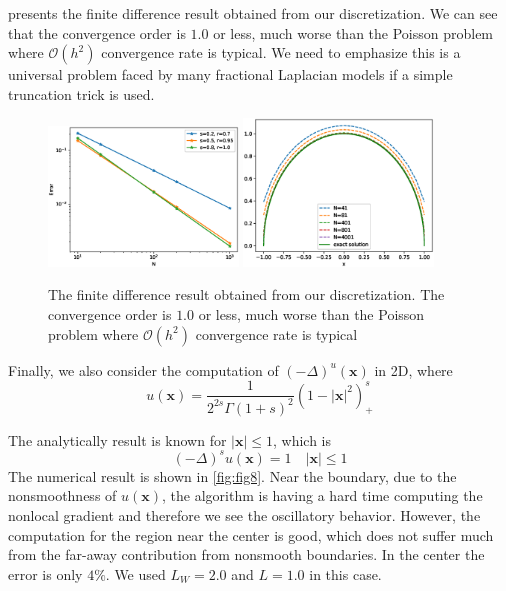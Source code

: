 \documentclass[3p,,preprint,12pt]{elsarticle}
\newcommand{\bx}[0]{\mathbf{x}}
\theoremstyle{definition}
\begin{document}
 presents the finite difference result obtained from our discretization. We can see that the convergence order is $1.0$ or less, much worse than the Poisson problem where $\mathcal{O}(h^2)$ convergence rate is typical. We need to emphasize this is a universal problem faced by many fractional Laplacian models if a simple truncation trick is used. 

\begin{figure}[H] %
\centering
\includegraphics[width=0.45\textwidth,keepaspectratio]{figures/fig6}
\includegraphics[width=0.45\textwidth,keepaspectratio]{figures/fig7}
\caption{The finite difference result obtained from our discretization. The convergence order is $1.0$ or less, much worse than the Poisson problem where $\mathcal{O}(h^2)$ convergence rate is typical}
\label{fig:fig6}
\end{figure}

Finally, we also consider the computation of $(-\Delta)^ u(\bx)$ in 2D, where~\cite{huang2016finite}
\begin{equation}
	u(\bx) = \frac{1}{2^{2s}\Gamma(1+s)^2} (1-|\bx|^2)^s_+
\end{equation}

The analytically result is known for $|\bx|\leq 1$, which is
\begin{equation}\label{equ:u1}
	(-\Delta)^s u(\bx) = 1\quad |\bx|\leq 1
\end{equation}
The numerical result is shown in \cref{fig:fig8}. Near the boundary, due to the nonsmoothness of $u(\bx)$, the algorithm is having a hard time computing the nonlocal gradient and therefore we see the oscillatory behavior. However, the computation for the region near the center is  good, which does not suffer much from the far-away contribution from nonsmooth boundaries. In the center the error is only $4\%$. We used $L_W=2.0$ and $L=1.0$ in this case.  
\end{document}
